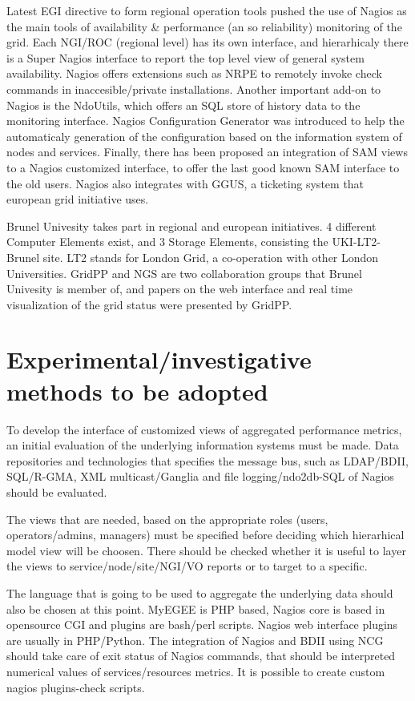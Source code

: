 Latest EGI directive to form regional operation tools pushed the use of Nagios \cite{imamagic2007grid} as the main tools of availability \& performance (an so reliability) monitoring of the grid. Each NGI/ROC (regional level) has its own interface, and hierarhicaly there is a Super Nagios interface to report the top level view of general system availability. Nagios offers extensions such as NRPE to remotely invoke check commands in inaccesible/private installations. Another important add-on to Nagios is the NdoUtils, which offers an SQL store of history data to the monitoring interface. Nagios Configuration Generator was introduced to help the automaticaly generation of the configuration based on the information system of nodes and services. Finally, there has been proposed an integration of SAM views to a Nagios customized interface, to offer the last good known SAM interface to the old users. Nagios also integrates with GGUS, a ticketing system that european grid initiative uses.

Brunel Univesity takes part in regional and european initiatives. 4 different Computer Elements exist, and 3 Storage Elements, consisting the UKI-LT2-Brunel site. LT2 stands for London Grid, a co-operation with other London Universities. GridPP and NGS are two collaboration groups that Brunel Univesity is member of, and papers on the web interface \cite{Hobson2007} and real time visualization of the grid status were presented \cite{Huang2007} by GridPP.

\section[Experimental]{Experimental/investigative methods to be adopted}

To develop the interface of customized views of aggregated performance metrics, an initial evaluation of the underlying information systems must be made. Data repositories and technologies that specifies the message bus, such as LDAP/BDII, SQL/R-GMA, XML multicast/Ganglia and file logging/ndo2db-SQL of Nagios should be evaluated. 

The views that are needed, based on the appropriate roles (users, operators/admins, managers) must be specified before deciding which hierarhical model view will be choosen. There should be checked whether it is useful to layer the views to service/node/site/NGI/VO reports or to target to a specific.

The language that is going to be used to aggregate the underlying data should also be chosen at this point. MyEGEE is PHP based, Nagios core is based in opensource CGI and plugins are bash/perl scripts. Nagios web interface plugins are usually in PHP/Python. The integration of Nagios and BDII using NCG should take care of exit status of Nagios commands, that should be interpreted numerical values of services/resources metrics. It is possible to create custom nagios plugins-check scripts. 

